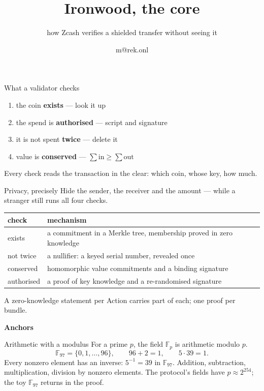 \documentclass[aspectratio=169,11pt]{beamer}
\title{Ironwood, the core}
\subtitle{how Zcash verifies a shielded transfer without seeing it}
\author{m@rek.onl}
\date{}
\newcommand{\F}{\mathbb{F}}
\newcommand{\divider}[1]{\begin{frame}[plain]\vfill\centering
  {\usebeamercolor[fg]{structure}\Huge\bfseries #1}\vfill\end{frame}}
\newcommand{\grey}[1]{{\color{arbdim}#1}}
\begin{document}
\begin{frame}[plain]
\titlepage
\end{frame}

\begin{frame}{What a validator checks}
\Large
\begin{enumerate}\itemsep8pt
  \item the coin \textbf{exists} \grey{--- look it up}
  \item the spend is \textbf{authorised} \grey{--- script and signature}
  \item it is not spent \textbf{twice} \grey{--- delete it}
  \item value is \textbf{conserved} \grey{--- $\sum\mathrm{in} \ge \sum\mathrm{out}$}
\end{enumerate}
\vfill
\normalsize
Every check reads the transaction in the clear: which coin, whose key,
how much.
\end{frame}

\begin{frame}{Privacy, precisely}
Hide the sender, the receiver and the amount --- while a stranger still
runs all four checks.
\vfill
\begin{center}
\begin{tabular}{@{}l>{\raggedright\arraybackslash}p{}@{}}
\toprule
check & mechanism \\
\midrule
exists & a commitment in a Merkle tree, membership proved in zero knowledge \\
not twice & a nullifier: a keyed serial number, revealed once \\
conserved & homomorphic value commitments and a binding signature \\
authorised & a proof of key knowledge and a re-randomised signature \\
\bottomrule
\end{tabular}
\end{center}
\vfill
A zero-knowledge statement per Action carries part of each; one proof per bundle.
\end{frame}

\divider{Anchors}

\begin{frame}{Arithmetic with a modulus}
For a prime $p$, the field $\F_p$ is arithmetic modulo $p$.
\[
\F_{97} = \{0, 1, \ldots, 96\},\qquad 96 + 2 = 1,\qquad 5 \cdot 39 = 1 .
\]
\vfill
Every nonzero element has an inverse: $5^{-1} = 39$ in $\F_{97}$.
\vfill
Addition, subtraction, multiplication, division by nonzero elements.
The protocol's fields have $p \approx 2^{254}$; the toy $\F_{97}$ returns
in the proof.
\end{frame}
\end{document}
